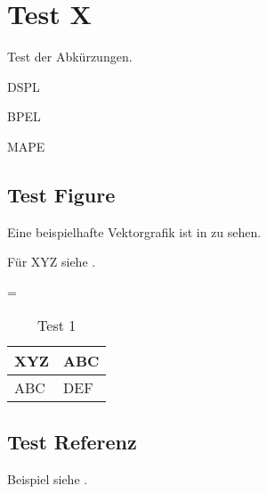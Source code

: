 \chapter{Test X}
Test der Abkürzungen.

\ac{DSPL}

\acs{BPEL}

\acl{MAPE}

%
%
%
\section{Test Figure}

Eine beispielhafte Vektorgrafik ist in  zu sehen.


Für XYZ siehe .

{
\tabulinesep=\tabcolsep
\begin{longtabu} to \textwidth {|X[3]|X[7]|}
\caption{\label{tbl:test}Test 1} \\
\hline
  \textbf{XYZ} & \textbf{ABC} \\
  \hline
  ABC & DEF \\
  \hline
\end{longtabu}
}

\section{Test Referenz}
Beispiel siehe \citeauthor{marquezan_towards_2014} \cite{marquezan_towards_2014}.